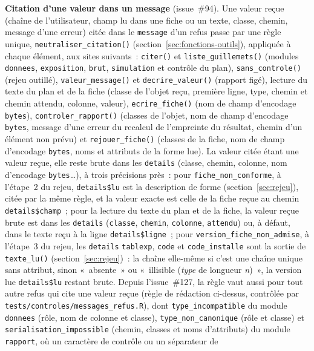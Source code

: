 \documentclass[a4paper,11pt]{article}
\newcommand{\code}[1]{\texttt{\small #1}}
\begin{document}
\medskip
\noindent
\textbf{Citation d'une valeur dans un message} (issue~\#94). Une valeur
reçue (chaîne de l'utilisateur, champ lu dans une fiche ou un texte, classe,
chemin, message d'une erreur) citée dans le \code{message} d'un refus passe
par une règle unique, \code{neutraliser\_citation()}
(section~\ref{sec:fonctions-outils}), appliquée à chaque élément, aux
sites suivants~: \code{citer()} et
\code{liste\_guillemets()} (modules \code{donnees}, \code{exposition},
\code{brut}, \code{simulation} et contrôle du plan), \code{sans\_controle()}
(rejeu outillé), \code{valeur\_message()} et \code{decrire\_valeur()}
(rapport figé), lecture du texte du plan et de la fiche (classe de
l'objet reçu, première ligne, type, chemin et chemin attendu, colonne,
valeur), \code{ecrire\_fiche()} (nom de champ d'encodage \code{bytes}),
\code{controler\_rapport()} (classes de l'objet, nom de champ d'encodage
\code{bytes}, message d'une erreur du recalcul de l'empreinte du
résultat, chemin d'un élément non prévu) et \code{rejouer\_fiche()}
(classes de la fiche, nom de champ d'encodage \code{bytes}, noms et
attributs de la forme lue). La valeur citée étant une valeur reçue, elle
reste brute dans les \code{details} (classe, chemin, colonne, nom
d'encodage \code{bytes}\ldots), à trois précisions près~: pour
\code{fiche\_non\_conforme}, à l'étape~2 du rejeu, \code{details\$lu} est
la description de forme (section~\ref{sec:rejeu}), citée par la même
règle, et la valeur exacte est celle de la fiche reçue au chemin
\code{details\$champ}~; pour la lecture du texte du plan et de la fiche,
la valeur reçue brute est dans les \code{details} (\code{classe},
\code{chemin}, \code{colonne}, \code{attendu}) ou, à défaut, dans le
texte reçu à la ligne \code{details\$ligne}~; pour
\code{version\_fiche\_non\_admise}, à l'étape~3 du rejeu, les
\code{details} \code{tablexp}, \code{code} et \code{code\_installe} sont
la sortie de \code{texte\_lu()} (section~\ref{sec:rejeu})~: la chaîne
elle-même si c'est une chaîne unique sans attribut, sinon «~absente~» ou «~illisible (\emph{type} de
longueur \emph{n})~», la version lue \code{details\$lu} restant brute.
Depuis l'issue~\#127, la règle vaut aussi pour tout autre refus qui
cite une valeur reçue (règle de rédaction ci-dessus, contrôlée par
\code{tests/controles/messages\_refus.R}), dont \code{type\_incompatible}
du module \code{donnees} (rôle, nom de colonne et classe),
\code{type\_non\_canonique} (rôle et classe) et
\code{serialisation\_impossible} (chemin, classes et noms d'attributs) du
module \code{rapport}, où un caractère de contrôle ou un séparateur de
\end{document}
